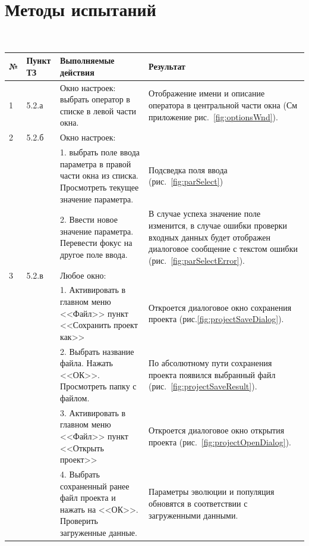 \documentclass[russian,utf8,emptystyle]{eskdtext}
\begin{document}
\section{Методы испытаний}
~\\
\begin{longtable}{
  p{0.7cm}|p{1.5cm}|p{6.5cm}|p{6.5cm}
}

№ & Пункт ТЗ & Выполняемые действия & Результат \\ \hline 
\endhead

1 & 5.2.а & Окно настроек: выбрать оператор в списке в левой части окна. & Отображение имени и описание оператора в центральной части окна (См приложение рис.~\ref{fig:optionsWnd}). \\ 
\hline 

2 & 5.2.б & Окно настроек: & \\
  &       & 1. выбрать поле ввода параметра в правой части окна из списка. Просмотреть текущее значение параметра. & Подсведка поля ввода (рис.~\ref{fig:parSelect}) \\
\cline{3-4}
  &       & 2. Ввести новое значение параметра. Перевести фокус на другое поле ввода. & В случае успеха значение поле изменится, в случае ошибки проверки входных данных будет отображен диалоговое сообщение с текстом ошибки (рис.~\ref{fig:parSelectError}). \\
\hline

3 & 5.2.в & Любое окно: & \\
  &       & 1. Активировать в главном меню <<Файл>> пункт <<Сохранить проект как>> & Откроется диалоговое окно сохранения проекта (рис.\ref{fig:projectSaveDialog}). \\
\cline{3-4}
  &       & 2. Выбрать название файла. Нажать <<ОК>>. Просмотреть папку с файлом. & По абсолютному пути сохранения проекта появился выбранный файл (рис.~\ref{fig:projectSaveResult}). \\
\cline{3-4}
  &       & 3. Активировать в главном меню <<Файл>> пункт <<Открыть проект>> & Откроется диалоговое окно открытия проекта (рис.~\ref{fig:projectOpenDialog}). \\
\cline{3-4}
  &       & 4. Выбрать сохраненный ранее файл проекта и нажать на <<ОК>>. Проверить загруженные данные. & Параметры эволюции и популяция обновятся в соответствии с загруженными данными. \\
\hline


\end{longtable}
\end{document}
